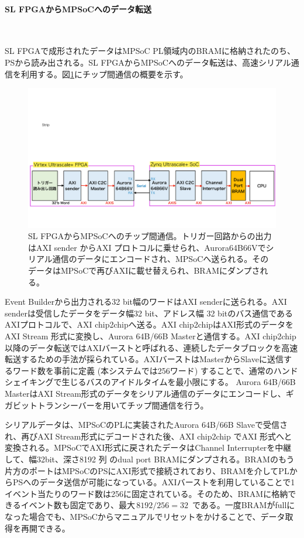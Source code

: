 \paragraph{SL FPGAからMPSoCへのデータ転送}　　
\par
SL FPGAで成形されたデータはMPSoC PL領域内のBRAMに格納されたのち、PSから読み出される。SL FPGAからMPSoCへのデータ転送は、高速シリアル通信を利用する。図\ref{C2C}にチップ間通信の概要を示す。
\begin{figure} 
\centering
\includegraphics[width=16cm]{fig/Test/C2C.pdf}
\caption[SL FPGAからMPSoCへのチップ間通信]{SL FPGAからMPSoCへのチップ間通信。トリガー回路からの出力はAXI sender からAXI プロトコルに乗せられ、Aurora64B66Vでシリアル通信のデータにエンコードされ、MPSoCへ送られる。そのデータはMPSoCで再びAXIに載せ替えられ、BRAMにダンプされる。}
\label{C2C}
\end{figure}

Event Builderから出力される32 bit幅のワードはAXI senderに送られる。AXI senderは受信したデータをデータ幅32 bit、アドレス幅 32 bitのバス通信であるAXIプロトコルで、AXI chip2chipへ送る。AXI chip2chipはAXI形式のデータをAXI Stream 形式に変換し、Aurora 64B/66B Masterと通信する。AXI chip2chip以降のデータ転送ではAXIバーストと呼ばれる、連続したデータブロックを高速転送するための手法が採られている。AXIバーストはMasterからSlaveに送信するワード数を事前に定義 (本システムでは256ワード) することで、通常のハンドシェイキングで生じるバスのアイドルタイムを最小限にする。
Aurora 64B/66B MasterはAXI Stream形式のデータをシリアル通信のデータにエンコードし、ギガビットトランシーバーを用いてチップ間通信を行う。

シリアルデータは、MPSoCのPLに実装されたAurora 64B/66B Slaveで受信され、再びAXI Stream形式にデコードされた後、AXI chip2chip でAXI 形式へと変換される。MPSoCでAXI形式に戻されたデータはChannel Interrupterを中継して、幅32bit、深さ8192 列 のdual port BRAMにダンプされる。BRAMのもう片方のポートはMPSoCのPSにAXI形式で接続されており、BRAMを介してPLからPSへのデータ送信が可能になっている。AXIバーストを利用していることで1イベント当たりのワード数は256に固定されている。そのため、BRAMに格納できるイベント数も固定であり、最大$ \,8192 / 256 = 32\,$ である。一度BRAMがfullになった場合でも、MPSoCからマニュアルでリセットをかけることで、データ取得を再開できる。

